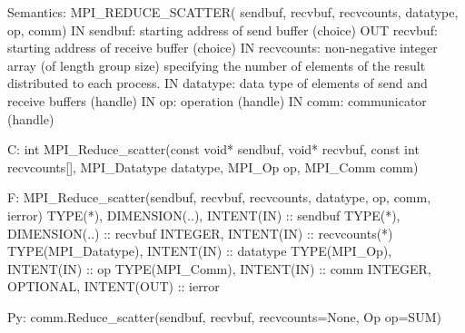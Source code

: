 Semantics:
MPI_REDUCE_SCATTER( sendbuf, recvbuf, recvcounts, datatype, op, comm)
IN sendbuf: starting address of send buffer (choice)
OUT recvbuf: starting address of receive buffer (choice)
IN recvcounts: non-negative integer array (of length group size)
    specifying the number of elements of the result distributed to each
    process.
IN datatype: data type of elements of send and receive buffers (handle)
IN op: operation (handle)
IN comm: communicator (handle)

C:
int MPI_Reduce_scatter(const void* sendbuf, void* recvbuf, const int
recvcounts[], MPI_Datatype datatype, MPI_Op op, MPI_Comm comm)

F:
MPI_Reduce_scatter(sendbuf, recvbuf, recvcounts, datatype, op, comm,
ierror)
TYPE(*), DIMENSION(..), INTENT(IN) :: sendbuf
TYPE(*), DIMENSION(..) :: recvbuf
INTEGER, INTENT(IN) :: recvcounts(*)
TYPE(MPI_Datatype), INTENT(IN) :: datatype
TYPE(MPI_Op), INTENT(IN) :: op
TYPE(MPI_Comm), INTENT(IN) :: comm
INTEGER, OPTIONAL, INTENT(OUT) :: ierror

Py:
comm.Reduce_scatter(sendbuf, recvbuf, recvcounts=None, Op op=SUM)
